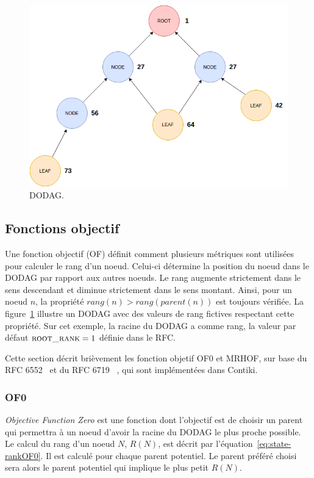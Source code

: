     \begin{figure}[H]
        \centering
        \includegraphics[scale=0.45]{res/pictures/dodag.drawio.png}
        \caption{DODAG.}
        \label{fig:state-dodag}
    \end{figure}


\subsection*{Fonctions objectif}
Une fonction objectif (OF) définit comment plusieurs métriques sont utilisées pour calculer le rang d'un noeud. Celui-ci détermine la position du noeud dans le DODAG par rapport aux autres noeuds.
Le rang augmente strictement dans le sens descendant et diminue strictement dans le sens montant. Ainsi, pour un noeud $n$, la propriété $rang(n)>rang(parent(n))$ est toujours vérifiée. La figure~\ref{fig:state-dodag} illustre un DODAG avec des valeurs de rang fictives respectant cette propriété. Sur cet exemple, la racine du DODAG a comme rang, la valeur par défaut $\textsc{root\_rank}=1$ définie dans le RFC.

Cette section décrit brièvement les fonction objetif OF0 et MRHOF, sur base du RFC 6552~\cite{rfc:of0} et du RFC 6719 ~\cite{rfc:mrhof}, qui sont implémentées dans Contiki.

    \subsubsection*{OF0}
        \textit{Objective Function Zero} est une fonction dont l'objectif est de choisir un parent qui permettra à un noeud d'avoir la racine du DODAG le plus proche possible.
        Le calcul du rang d'un noeud $N$, $R(N)$, est décrit par l'équation~\ref{eq:state-rankOF0}. Il est calculé pour chaque parent potentiel. Le parent préféré choisi sera alors le parent potentiel qui implique le plus petit $R(N)$.\par


